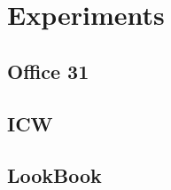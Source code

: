 \documentclass[../main.tex]{subfiles}
\begin{document}
    \section{Experiments}
    \subsection{Office 31}
    \subsection{ICW}
    \subsection{LookBook}
\end{document}
